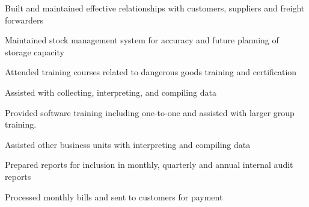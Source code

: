 \documentclass[]{deedy-resume-openfont}
\begin{document}
\begin{minipage}[t]{4in}
\begin{tightemize}
\item Built and maintained effective relationships with customers, suppliers and freight forwarders
\item Maintained stock management system for accuracy and future planning of storage capacity
\item Attended training courses related to dangerous goods training and certification
\end{tightemize}
\sectionsep

\vspace{\topsep} %
\begin{tightemize}
\item Assisted with collecting, interpreting, and compiling data
\item Provided software training including one-to-one and assisted with larger group training.
\item Assisted other business units with interpreting and compiling data
\end{tightemize}
\sectionsep

\begin{tightemize}
\item Prepared reports for inclusion in monthly, quarterly and annual internal audit reports
\item Processed monthly bills and sent to customers for payment
\end{tightemize}
\sectionsep




\end{minipage} 
\end{document}
